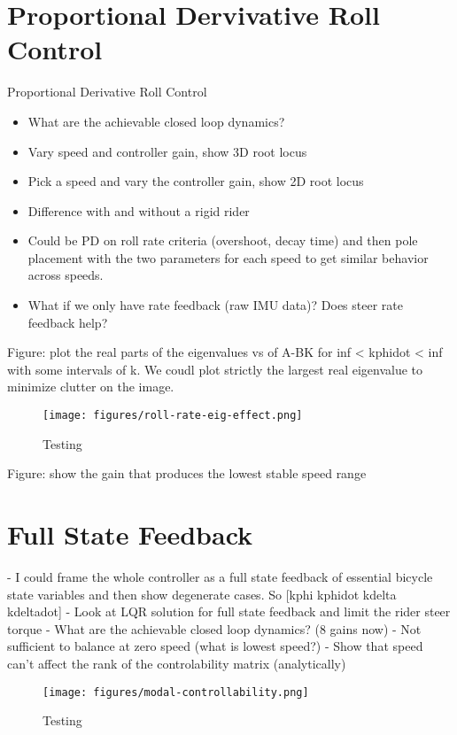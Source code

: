 \documentclass[12pt]{article}
\begin{document}
\section{Proportional Dervivative Roll Control}

Proportional Derivative Roll Control

\begin{itemize}
  \item What are the achievable closed loop dynamics?
  \item Vary speed and controller gain, show 3D root locus
  \item Pick a speed and vary the controller gain, show 2D root locus
  \item Difference with and without a rigid rider
  \item Could be PD on roll rate criteria (overshoot, decay time) and then pole
    placement with the two parameters for each speed to get similar behavior
    across speeds.
  \item What if we only have rate feedback (raw IMU data)? Does steer rate
    feedback help?
\end{itemize}


Figure: plot the real parts of the eigenvalues vs of A-BK for inf < kphidot <
inf with some intervals of k. We coudl plot strictly the largest real
eigenvalue to minimize clutter on the image.

\begin{figure}
  \centering
  \texttt{[image: figures/roll-rate-eig-effect.png]}
  \caption{Testing}
  \label{fig:roll-rate-eig-effect}
\end{figure}

Figure: show the gain that produces the lowest stable speed range

\section{Full State Feedback}

- I could frame the whole controller as a full state feedback of essential
bicycle state variables and then show degenerate cases. So [kphi kphidot kdelta
kdeltadot]
- Look at LQR solution for full state feedback and limit the rider steer torque
- What are the achievable closed loop dynamics? (8 gains now)
- Not sufficient to balance at zero speed (what is lowest speed?)
- Show that speed can't affect the rank of the controlability matrix
(analytically)

\begin{figure}
  \centering
  \texttt{[image: figures/modal-controllability.png]}
  \caption{Testing}
  \label{fig:modal-controllability}
\end{figure}
\end{document}
